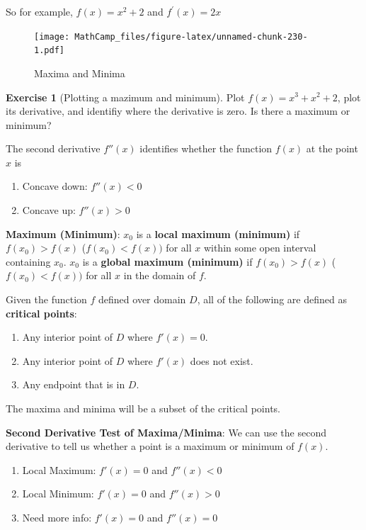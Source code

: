 \documentclass[
]{book}
\providecommand{\tightlist}{%
  \setlength{\itemsep}{0pt}\setlength{\parskip}{0pt}}
\theoremstyle{definition}
\theoremstyle{definition}
\theoremstyle{definition}
\newtheorem{exercise}{Exercise}[chapter]
\theoremstyle{definition}
\theoremstyle{remark}
\begin{document}
So for example, \(f(x) = x^2 + 2\) and \(f^\prime(x) = 2x\)

\begin{figure}
\centering
\texttt{[image: MathCamp\_files/figure-latex/unnamed-chunk-230-1.pdf]}
\caption{\label{fig:unnamed-chunk-230}Maxima and Minima}
\end{figure}

\begin{exercise}[Plotting a mazimum and minimum]
\protect\hypertarget{exr:unnamed-chunk-231}{}{\label{exr:unnamed-chunk-231} {} }Plot \(f(x)=x^3+ x^2 + 2\), plot its derivative, and identifiy where the derivative is zero. Is there a maximum or minimum?
\end{exercise}

The second derivative \(f''(x)\) identifies whether the function \(f(x)\) at the point \(x\) is

\begin{enumerate}
\def\labelenumi{\arabic{enumi}.}
\tightlist
\item
  Concave down: \(f''(x)<0\)
\item
  Concave up: \(f''(x)>0\)
\end{enumerate}

\textbf{Maximum (Minimum)}: \(x_0\) is a \textbf{local maximum (minimum)} if \(f(x_0)>f(x)\) (\(f(x_0)<f(x))\) for all \(x\) within some open interval containing \(x_0\). \(x_0\) is a \textbf{global maximum (minimum)} if \(f(x_0)>f(x)\) (\(f(x_0)<f(x))\) for all \(x\) in the domain of \(f\).

Given the function \(f\) defined over domain \(D\), all of the following are defined as \textbf{critical points}:

\begin{enumerate}
\def\labelenumi{\arabic{enumi}.}
\tightlist
\item
  Any interior point of \(D\) where \(f'(x)=0\).
\item
  Any interior point of \(D\) where \(f'(x)\) does not exist.
\item
  Any endpoint that is in \(D\).
\end{enumerate}

The maxima and minima will be a subset of the critical points.

\textbf{Second Derivative Test of Maxima/Minima}: We can use the second derivative to tell us whether a point is a maximum or minimum of \(f(x)\).

\begin{enumerate}
\def\labelenumi{\arabic{enumi}.}
\tightlist
\item
  Local Maximum: \(f'(x)=0\) and \(f''(x)<0\)
\item
  Local Minimum: \(f'(x)=0\) and \(f''(x)>0\)
\item
  Need more info: \(f'(x)=0\) and \(f''(x)=0\)
\end{enumerate}
\end{document}

